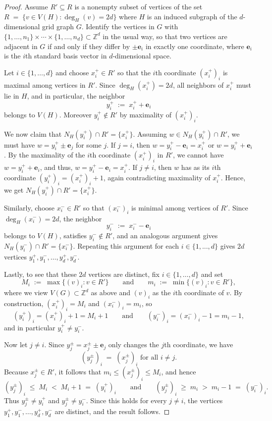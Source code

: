 \documentclass[10pt,a4paper]{amsart}
\begin{document}
\begin{proof}
Assume $R'\subseteq R$ is a nonempty subset of vertices of the set $R \;=\; \{v\in V(H): \deg_H(v)=2d\}$ where $H$ is an induced subgraph of the $d$-dimensional grid graph $G$. Identify the vertices in $G$ with $\{1,\dots,n_1\}\times\cdots\times\{1,\dots,n_d\}\subset \mathbb{Z}^d$ in the usual way, so that
two vertices are adjacent in $G$ if and only if they differ by $\pm \mathbf{e}_i$ in exactly one coordinate, where
$\mathbf{e}_i$ is the $i$th standard basis vector in $d$-dimensional space.

Let $i\in\{1,\dots,d\}$ and choose $x_i^+\in R'$ so that the $i$th coordinate $(x_i^+)_i$ is maximal among vertices in $R'$. Since $\deg_H(x_i^+)=2d$, all neighbors of $x_i^+$ must lie in $H$, and in particular, the neighbor
\[
y_i^+ \;:=\; x_i^+ + \mathbf{e}_i
\]
belongs to $V(H)$. Moreover $y_i^+\notin R'$ by maximality of $(x_i^+)_i$.

We now claim that $N_H(y_i^+)\cap R'=\{x_i^+\}$. Assuming $w\in N_H(y_i^+)\cap R'$, we must have $w=y_i^+\pm \mathbf{e}_j$ for some $j$.
If $j=i$, then $w=y_i^+-\mathbf{e}_i=x_i^+$ or $w=y_i^++\mathbf{e}_i$. By the maximality of the $i$th coordinate $(x_i^+)_i$ in $R'$, we cannot have $w = y_i^++\mathbf{e}_i$, and thus, $w=y_i^+-\mathbf{e}_i=x_i^+$. If $j\neq i$, then $w$ has as its $i$th coordinate $(y_i^+)_i=(x_i^+)_i+1$, again
contradicting maximality of $x_i^+$. Hence, we get $N_H(y_i^+)\cap R'=\{x_i^+\}$.

Similarly, choose $x_i^-\in R'$ so that $(x_i^-)_i$ is minimal among vertices of $R'$. Since $\deg_H(x_i^-)=2d$, the neighbor
\[
y_i^- \;:=\; x_i^- - \mathbf{e}_i
\]
belongs to $V(H)$, satisfies $y_i^-\notin R'$, and an analogous argument gives $N_H(y_i^-)\cap R'=\{x_i^-\}$. Repeating this argument for each $i\in \{1, ... , d\}$ gives $2d$ vertices  $y_1^+,y_1^-,\dots,y_d^+,y_d^-$. 

Lastly, to see that these $2d$ vertices are distinct, fix $i\in\{1,\dots,d\}$ and set
\[
M_i \;:=\; \max\{(v)_i : v\in R'\}
\qquad\text{and}\qquad
m_i \;:=\; \min\{(v)_i : v\in R'\},
\]
where we view $V(G)\subset\mathbb{Z}^d$ as above and $(v)_i$ as the $i$th coordinate of $v$. By construction, $(x_i^+)_i=M_i$ and $(x_i^-)_i=m_i$, so
\[
(y_i^+)_i=(x_i^+)_i+1=M_i+1
\qquad\text{and}\qquad
(y_i^-)_i=(x_i^-)_i-1=m_i-1,
\]
and in particular $y_i^+\neq y_i^-$.

Now let $j\neq i$. Since $y_j^\pm=x_j^\pm\pm \mathbf e_j$ only changes the $j$th coordinate, we have
\[
(y_j^\pm)_i \;=\; (x_j^\pm)_i \text{ for all } i\ne j.
\]
Because $x_j^\pm\in R'$, it follows that $m_i \le (x_j^\pm)_i \le M_i$, and hence
\[
(y_j^\pm)_i \;\le\; M_i \;<\; M_i+1 \;=\; (y_i^+)_i
\qquad\text{and}\qquad
(y_j^\pm)_i \;\ge\; m_i \;>\; m_i-1 \;=\; (y_i^-)_i.
\]
Thus $y_j^\pm \neq y_i^+$ and $y_j^\pm \neq y_i^-$. Since this holds for every $j\neq i$,
the vertices $y_1^+,y_1^-,\dots,y_d^+,y_d^-$ are distinct, and the result follows.


\end{proof}
\end{document}
